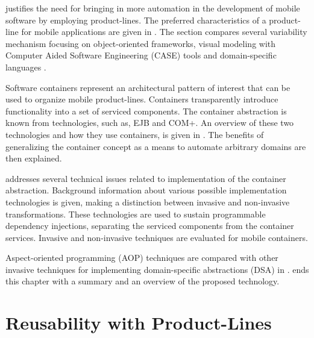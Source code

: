 
 justifies the need for bringing in more automation in the development of mobile software by employing product-lines. The preferred characteristics of a product-line for mobile applications are given in . The section compares several variability mechanism focusing on object-oriented frameworks, visual modeling with Computer Aided Software Engineering (CASE) tools and domain-specific languages . 

Software containers represent an architectural pattern of interest that can be used to organize mobile product-lines. Containers transparently introduce functionality into a set of serviced components. The container abstraction is known from technologies, such as, EJB and COM+. An overview of these two technologies and how they use containers, is given in . The benefits of generalizing the container concept as a means to automate arbitrary domains are then explained.

 addresses several technical issues related to implementation of the container abstraction. Background information about various possible implementation technologies is given, making a distinction between invasive and non-invasive transformations. These technologies are used to sustain programmable dependency injections, separating the serviced components from the container services. Invasive and non-invasive techniques are evaluated for mobile containers.

Aspect-oriented programming (AOP) techniques are compared with other invasive techniques for implementing domain-specific abstractions (DSA) in .  ends this chapter with a summary and an overview of the proposed technology.

\section{Reusability with Product-Lines}
\label{c2sec:pline}

